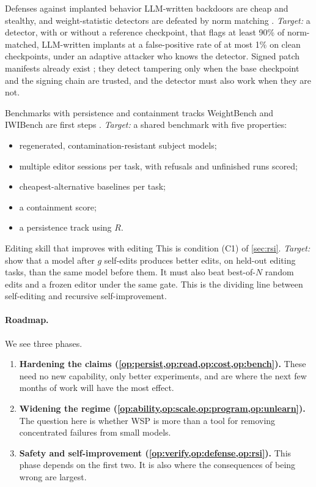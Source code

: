 \begin{openproblem}{Defenses against implanted behavior}\label{op:defense}
LLM-written backdoors are cheap and stealthy, and weight-statistic detectors are defeated by norm matching \citep{ax2611_27920,ax2611_27425,zen24156363}. \emph{Target:} a detector, with or without a reference checkpoint, that flags at least 90\% of norm-matched, LLM-written implants at a false-positive rate of at most 1\% on clean checkpoints, under an adaptive attacker who knows the detector. Signed patch manifests already exist \citep{zen23954378}; they detect tampering only when the base checkpoint and the signing chain are trusted, and the detector must also work when they are not.
\end{openproblem}

\begin{openproblem}{Benchmarks with persistence and containment tracks}\label{op:bench}
WeightBench and IWIBench are first steps \citep{ax2611_18553,ax2611_08647}. \emph{Target:} a shared benchmark with five properties:
\begin{itemize}[leftmargin=*,itemsep=1pt]
\item regenerated, contamination-resistant subject models;
\item multiple editor sessions per task, with refusals and unfinished runs scored;
\item cheapest-alternative baselines per task;
\item a containment score;
\item a persistence track using $R$.
\end{itemize}
\end{openproblem}

\begin{openproblem}{Editing skill that improves with editing}\label{op:rsi}
This is condition (C1) of \cref{sec:rsi}. \emph{Target:} show that a model after $g$ self-edits produces better edits, on held-out editing tasks, than the same model before them. It must also beat best-of-$N$ random edits and a frozen editor under the same gate. This is the dividing line between self-editing and recursive self-improvement.
\end{openproblem}

\paragraph{Roadmap.} We see three phases.
\begin{enumerate}[leftmargin=*,itemsep=2pt]
\item \textbf{Hardening the claims (\cref{op:persist,op:read,op:cost,op:bench}).} These need no new capability, only better experiments, and are where the next few months of work will have the most effect.
\item \textbf{Widening the regime (\cref{op:ability,op:scale,op:program,op:unlearn}).} The question here is whether WSP is more than a tool for removing concentrated failures from small models.
\item \textbf{Safety and self-improvement (\cref{op:verify,op:defense,op:rsi}).} This phase depends on the first two. It is also where the consequences of being wrong are largest.
\end{enumerate}
